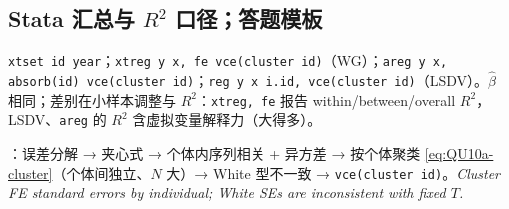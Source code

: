 \subsection{Stata 汇总与 \texorpdfstring{$R^2$}{R2} 口径；答题模板}
\texttt{xtset id year}；\texttt{xtreg y x, fe vce(cluster id)}（WG）；\texttt{areg y x, absorb(id) vce(cluster id)}；\texttt{reg y x i.id, vce(cluster id)}（LSDV）。$\hat\beta$ 相同；差别在小样本调整与 $R^2$：\texttt{xtreg, fe} 报告 within/between/overall $R^2$，LSDV、\texttt{areg} 的 $R^2$ 含虚拟变量解释力（大得多）。

：误差分解 → 夹心式 → 个体内序列相关 + 异方差 → 按个体聚类 \eqref{eq:QU10a-cluster}（个体间独立、$N$ 大）→ White 型不一致 → \texttt{vce(cluster id)}。\textit{Cluster FE standard errors by individual; White SEs are inconsistent with fixed $T$.}
